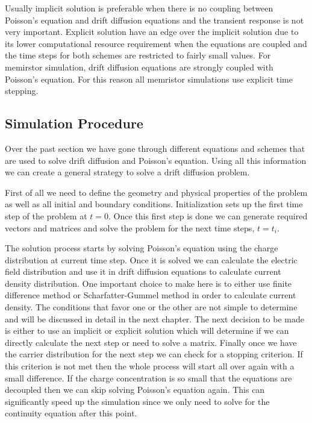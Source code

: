 Usually implicit solution is preferable when there is no coupling between Poisson's equation and drift diffusion equations and the transient response is not very important. Explicit solution have an edge over the implicit solution due to its lower computational resource requirement when the equations are coupled and the time steps for both schemes are restricted to fairly small values. For memirstor simulation, drift diffusion equations are strongly coupled with Poisson's equation. For this reason all memristor simulations use explicit time stepping. 

\clearpage
\subsection{Simulation Procedure}
Over the past section we have gone through different equations and schemes that are used to solve drift diffusion and Poisson's equation. Using all this information we can create a general strategy to solve a drift diffusion problem. 

First of all we need to define the geometry and physical properties of the problem as well as all initial and boundary conditions. Initialization sets up the first time step of the problem at $t=0$. Once this first step is done we can generate required vectors and matrices and solve the problem for the next time steps, $t=t_i$. 

The solution process starts by solving Poisson's equation using the charge distribution at current time step. Once it is solved we can calculate the electric field distribution and use it in drift diffusion equations to calculate current density distribution. One important choice to make here is to either use finite difference method or Scharfatter-Gummel method in order to calculate current density. The conditions that favor one or the other are not simple to determine and will be discussed in detail in the next chapter. The next decision to be made is either to use an implicit or explicit solution which will determine if we can directly calculate the next step or need to solve a matrix. Finally once we have the carrier distribution for the next step we can check for a stopping criterion. If this criterion is not met then the whole process will start all over again with a small difference. If the charge concentration is so small that the equations are decoupled then we can skip solving Poisson's equation again. This can significantly speed up the simulation since we only need to solve for the continuity equation after this point.

